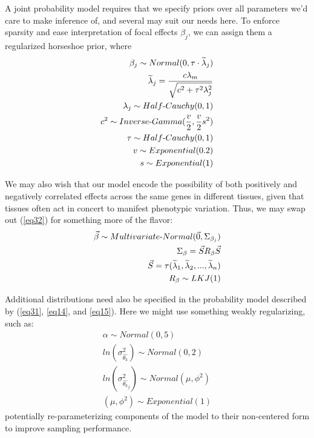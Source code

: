 \documentclass[12pt]{article}
\begin{document}
A joint probability model requires that we specify priors over all parameters we'd care to make inference of, and several may suit our needs here. To enforce sparsity and ease interpretation of focal effects $\beta_j$, we can assign them a regularized horseshoe prior, where
\begin{align}
\beta_j \sim Normal(0, \tau \cdot \widetilde{\lambda}_j) \label{eq32}\\
\widetilde{\lambda}_j = \frac{c\lambda_m}{\sqrt{c^2 + \tau^2\lambda^2_j}} \label{eq33}\\
\lambda_j \sim Half{\text -}Cauchy(0,1) \label{eq34}\\
c^2 \sim Inverse{\text -}Gamma(\frac{v}{2}, \frac{v}{2}s^2) \label{eq35}\\
\tau \sim Half{\text -}Cauchy(0,1) \label{eq36}\\
v \sim Exponential(0.2) \label{eq35.1}\\
s \sim  Exponential(1) \label{eq35.2}\\
\end{align}

We may also wish that our model encode the possibility of both positively and negatively correlated effects across the same genes in different tissues, given that tissues often act in concert to manifest phenotypic variation. Thus, we may swap out (\ref{eq32}) for something more of the flavor:
\begin{align}
\vec{\beta} \sim Multivariate{\text -}Normal(\vec{0}, \Sigma_{\beta_j}) \label{eq37}\\
\Sigma_{\beta} = \vec{S}R_{\beta}\vec{S} \label{eq38}\\
\vec{S} = \tau (\widetilde{\lambda}_1, \widetilde{\lambda}_2, ..., \widetilde{\lambda}_n) \label{eq39}\\
R_{\beta} \sim LKJ(1) \label{eq40}
\end{align}

Additional distributions need also be specified in the probability model described by (\ref{eq31}, \ref{eq14}, and \ref{eq15}). Here we might use something weakly regularizing, such as:
\begin{align}
\alpha \sim Normal(0, 5) \label{eq40}\\
ln(\sigma_{\hat{\theta_{k}}}^2) \sim Normal(0, 2) \label{eq40}\\
ln(\sigma_{\hat{\theta_{k}}_j}^2) \sim Normal(\mu, \phi^2) \label{eq41}\\
(\mu, \phi^2) \sim Exponential(1)
\end{align}
potentially re-parameterizing components of the model to their non-centered form to improve sampling performance.\\
\end{document}
